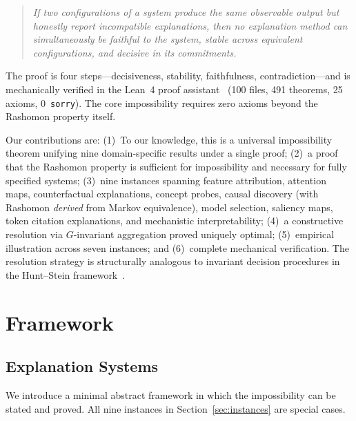 \documentclass[twocolumn]{article}
\begin{document}
\begin{quote}
\emph{If two configurations of a system produce the same observable output
but honestly report incompatible explanations, then no explanation method
can simultaneously be faithful to the system, stable across equivalent
configurations, and decisive in its commitments.}
\end{quote}

\noindent
The proof is four steps---decisiveness, stability, faithfulness,
contradiction---and is mechanically verified in the Lean~4 proof
assistant~\cite{demoura2021lean4} (100 files, 491 theorems, 25 axioms,
0~\texttt{sorry}). The core impossibility requires zero axioms beyond
the Rashomon property itself.

Our contributions are: (1)~To our knowledge, this is a universal impossibility theorem unifying
nine domain-specific results under a single proof; (2)~a proof that the
Rashomon property is sufficient for impossibility and necessary for fully
specified systems; (3)~nine instances spanning
feature attribution, attention maps, counterfactual explanations, concept
probes, causal discovery (with Rashomon \emph{derived} from Markov
equivalence), model selection, saliency maps, token citation explanations,
and mechanistic interpretability; (4)~a constructive resolution via
$G$-invariant aggregation proved uniquely optimal; (5)~empirical
illustration across seven instances; and (6)~complete mechanical
verification. The resolution strategy is structurally analogous to invariant decision
procedures in the Hunt--Stein framework~\cite{lehmann2005testing}.


\section{Framework}
\label{sec:framework}

\subsection{Explanation Systems}

We introduce a minimal abstract framework in which the impossibility can
be stated and proved. All nine instances in Section~\ref{sec:instances}
are special cases.
\end{document}
